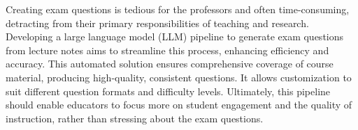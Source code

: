

{
   Creating exam questions is tedious for the professors and often time-consuming, detracting from their primary responsibilities of teaching and research. Developing a large language model (LLM) pipeline to generate exam questions from lecture notes aims to streamline this process, enhancing efficiency and accuracy. This automated solution ensures comprehensive coverage of course material, producing high-quality, consistent questions. It allows customization to suit different question formats and difficulty levels. Ultimately, this pipeline should enable educators to focus more on student engagement and the quality of instruction, rather than stressing about the exam questions.
	\vspace*{-1.2cm}
}


